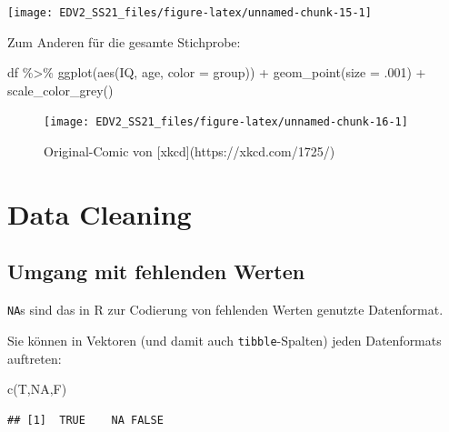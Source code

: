 \documentclass[
]{book}
\newenvironment{Shaded}{\begin{snugshade}}{\end{snugshade}}
\newcommand{\AttributeTok}[1]{\textcolor[rgb]{0.77,0.63,0.00}{#1}}
\newcommand{\ConstantTok}[1]{\textcolor[rgb]{0.00,0.00,0.00}{#1}}
\newcommand{\DecValTok}[1]{\textcolor[rgb]{0.00,0.00,0.81}{#1}}
\newcommand{\FunctionTok}[1]{\textcolor[rgb]{0.00,0.00,0.00}{#1}}
\newcommand{\NormalTok}[1]{#1}
\newcommand{\SpecialCharTok}[1]{\textcolor[rgb]{0.00,0.00,0.00}{#1}}
\begin{document}
\begin{center}\texttt{[image: EDV2\_SS21\_files/figure-latex/unnamed-chunk-15-1]} \end{center}

Zum Anderen für die gesamte Stichprobe:

\begin{Shaded}
\begin{Highlighting}[]
\NormalTok{df }\SpecialCharTok{\%\textgreater{}\%} 
  \FunctionTok{ggplot}\NormalTok{(}\FunctionTok{aes}\NormalTok{(IQ, age, }\AttributeTok{color =}\NormalTok{ group)) }\SpecialCharTok{+}
  \FunctionTok{geom\_point}\NormalTok{(}\AttributeTok{size =}\NormalTok{ .}\DecValTok{001}\NormalTok{) }\SpecialCharTok{+}
  \FunctionTok{scale\_color\_grey}\NormalTok{()}
\end{Highlighting}
\end{Shaded}

\begin{figure}

{\centering \texttt{[image: EDV2\_SS21\_files/figure-latex/unnamed-chunk-16-1]} 

}

\caption{Original-Comic von [xkcd](https://xkcd.com/1725/)}\label{fig:unnamed-chunk-16}
\end{figure}

\hypertarget{data-cleaning}{%
\section{Data Cleaning}\label{data-cleaning}}

\hypertarget{umgang-mit-fehlenden-werten}{%
\subsection{Umgang mit fehlenden Werten}\label{umgang-mit-fehlenden-werten}}

\texttt{NA}s sind das in R zur Codierung von fehlenden Werten genutzte Datenformat.

Sie können in Vektoren (und damit auch \texttt{tibble}-Spalten) jeden Datenformats auftreten:

\begin{Shaded}
\begin{Highlighting}[]
\FunctionTok{c}\NormalTok{(T,}\ConstantTok{NA}\NormalTok{,F)}
\end{Highlighting}
\end{Shaded}

\begin{verbatim}
## [1]  TRUE    NA FALSE
\end{verbatim}
\end{document}
